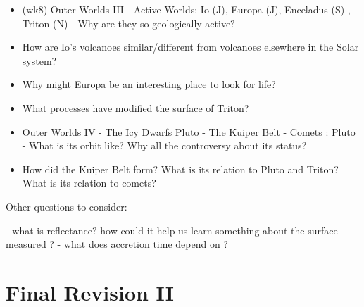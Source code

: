 \documentclass[paper=a4, fontsize=11pt]{scrartcl} %
\numberwithin{equation}{section} %
\begin{document}
\begin{itemize}
\item (wk8)   Outer Worlds III - Active Worlds:  Io (J),  Europa (J),  Enceladus (S) , Triton (N) - Why are they so geologically active?
\item How are Io's volcanoes similar/different from volcanoes elsewhere in the Solar system?
\item Why might Europa be an interesting place to look for life?
\item What processes have modified the surface of Triton?

\item Outer Worlds IV - The Icy Dwarfs Pluto - The Kuiper Belt - Comets : Pluto -  What is its orbit like?
Why all the controversy about its status?
\item  How did the Kuiper Belt form? What is its relation to Pluto and Triton? What is its relation to comets?

\end{itemize}

Other questions to consider:

- what is reflectance? how could it help us learn something about the surface measured ? 
- what does accretion time depend on ? 




\section{Final Revision II }
\end{document}

